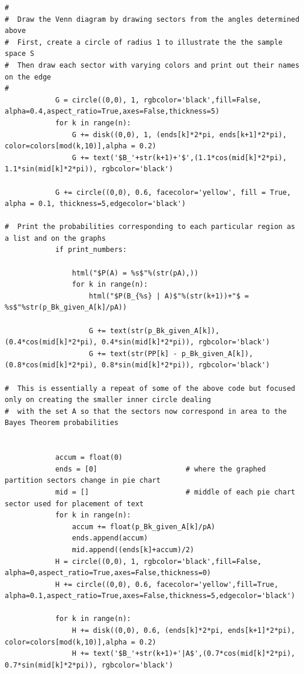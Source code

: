 \documentclass[10pt,]{book}
\theoremstyle{plain}
\theoremstyle{definition}
\theoremstyle{definition}
\theoremstyle{definition}
\numberwithin{equation}{section}
\begin{document}
\begin{lstlisting}[style=sageinput]
#        
#  Draw the Venn diagram by drawing sectors from the angles determined above
#  First, create a circle of radius 1 to illustrate the the sample space S
#  Then draw each sector with varying colors and print out their names on the edge
#
            G = circle((0,0), 1, rgbcolor='black',fill=False, alpha=0.4,aspect_ratio=True,axes=False,thickness=5)
            for k in range(n):
                G += disk((0,0), 1, (ends[k]*2*pi, ends[k+1]*2*pi), color=colors[mod(k,10)],alpha = 0.2)
                G += text('$B_'+str(k+1)+'$',(1.1*cos(mid[k]*2*pi), 1.1*sin(mid[k]*2*pi)), rgbcolor='black')
                
            G += circle((0,0), 0.6, facecolor='yellow', fill = True, alpha = 0.1, thickness=5,edgecolor='black') 
    
#  Print the probabilities corresponding to each particular region as a list and on the graphs
            if print_numbers:               

                html("$P(A) = %s$"%(str(pA),))
                for k in range(n):
                    html("$P(B_{%s} | A)$"%(str(k+1))+"$ = %s$"%str(p_Bk_given_A[k]/pA))
                                        
                    G += text(str(p_Bk_given_A[k]),(0.4*cos(mid[k]*2*pi), 0.4*sin(mid[k]*2*pi)), rgbcolor='black')
                    G += text(str(PP[k] - p_Bk_given_A[k]),(0.8*cos(mid[k]*2*pi), 0.8*sin(mid[k]*2*pi)), rgbcolor='black')
        
#  This is essentially a repeat of some of the above code but focused only on creating the smaller inner circle dealing
#  with the set A so that the sectors now correspond in area to the Bayes Theorem probabilities


            accum = float(0)                        
            ends = [0]                     # where the graphed partition sectors change in pie chart 
            mid = []                       # middle of each pie chart sector used for placement of text
            for k in range(n): 
                accum += float(p_Bk_given_A[k]/pA) 
                ends.append(accum)
                mid.append((ends[k]+accum)/2)
            H = circle((0,0), 1, rgbcolor='black',fill=False, alpha=0,aspect_ratio=True,axes=False,thickness=0)
            H += circle((0,0), 0.6, facecolor='yellow',fill=True, alpha=0.1,aspect_ratio=True,axes=False,thickness=5,edgecolor='black')
            
            for k in range(n):
                H += disk((0,0), 0.6, (ends[k]*2*pi, ends[k+1]*2*pi), color=colors[mod(k,10)],alpha = 0.2)
                H += text('$B_'+str(k+1)+'|A$',(0.7*cos(mid[k]*2*pi), 0.7*sin(mid[k]*2*pi)), rgbcolor='black')
                    

\end{lstlisting}
\end{document}

